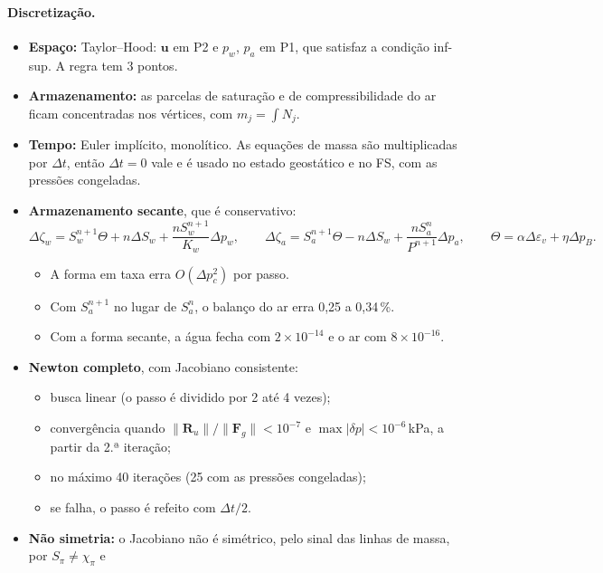 \paragraph{Discretização.}
\begin{itemize}
  \item \textbf{Espaço:} Taylor--Hood: $\bm u$ em P2 e $p_w$, $p_a$ em P1, que satisfaz a condição inf-sup. A regra tem
    3 pontos.
  \item \textbf{Armazenamento:} as parcelas de saturação e de compressibilidade do ar ficam concentradas nos vértices,
    com $m_j = \int N_j$.
  \item \textbf{Tempo:} Euler implícito, monolítico. As equações de massa são multiplicadas por $\Delta t$, então
    $\Delta t = 0$ vale e é usado no estado geostático e no FS, com as pressões congeladas.
  \item \textbf{Armazenamento secante}, que é conservativo:
    \begin{equation}
      \Delta\zeta_w = S_w^{n+1}\Theta + n\Delta S_w + \frac{nS_w^{n+1}}{K_w}\Delta p_w, \qquad
      \Delta\zeta_a = S_a^{n+1}\Theta - n\Delta S_w + \frac{nS_a^{n}}{P^{n+1}}\Delta p_a, \qquad
      \Theta = \alpha\Delta\varepsilon_v + \eta\Delta p_B .
    \end{equation}
    \begin{itemize}
      \item A forma em taxa erra $O(\Delta p_c^2)$ por passo.
      \item Com $S_a^{n+1}$ no lugar de $S_a^n$, o balanço do ar erra 0,25 a 0,34\,\%.
      \item Com a forma secante, a água fecha com $2\times10^{-14}$ e o ar com $8\times10^{-16}$.
    \end{itemize}
  \item \textbf{Newton completo}, com Jacobiano consistente:
    \begin{itemize}
      \item busca linear (o passo é dividido por 2 até 4 vezes);
      \item convergência quando $\|\bm R_u\|/\|\bm F_g\| < 10^{-7}$ e $\max|\delta p| < 10^{-6}$\,kPa, a partir da 2.ª
        iteração;
      \item no máximo 40 iterações (25 com as pressões congeladas);
      \item se falha, o passo é refeito com $\Delta t/2$.
    \end{itemize}
  \item \textbf{Não simetria:} o Jacobiano não é simétrico, pelo sinal das linhas de massa, por $S_\pi \neq \chi_\pi$ e

\end{itemize}
